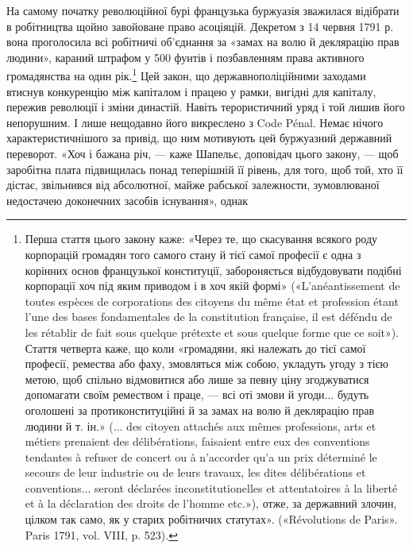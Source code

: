 На самому початку революційної бурі французька буржуазія
зважилася відібрати в робітництва щойно завойоване право
асоціяцій. Декретом з 14 червня 1791 р. вона проголосила всі
робітничі об’єднання за «замах на волю й деклярацію прав людини»,
караний штрафом у 500 фунтів і позбавленням права
активного громадянства на один рік.\footnote{
Перша стаття цього закону каже: «Через те, що скасування
всякого роду корпорацій громадян того самого стану й тієї самої професії
є одна з корінних основ французької конституції, забороняється відбудовувати
подібні корпорації хоч під яким приводом і в хоч якій формі»
(«L’anéantissement de toutes espèces de corporations des citoyens du même
état et profession étant l’une des bases fondamentales de la constitution
française, il est déféndu de les rétablir de fait sous quelque prétexte et
sous quelque forme que ce soit»). Стаття четверта каже, що коли «громадяни,
які належать до тієї самої професії, ремества або фаху, змовляться
між собою, укладуть угоду з тією метою, щоб спільно відмовитися
або лише за певну ціну згоджуватися допомагати своїм ремеством і праце,
— всі оті змови й угоди... будуть оголошені за протиконституційні
й за замах на волю й деклярацію прав людини й т. ін.» (... des citoyen
attachés aux mêmes professions, arts et métiers prenaient des délibérations,
faisaient entre eux des conventions tendantes à refuser de concert ou
à n’accorder qu’a un prix déterminé le secours de leur industrie ou de
leurs travaux, les dites délibérations et conventions... seront déclarées
inconstitutionelles et attentatoires à la liberté et à la déclaration des
droits de l’homme etc.»), отже, за державний злочин, цілком так само,
як у старих робітничих статутах». («Révolutions de Paris». Paris 1791,
vol. VIII, p. 523).
} Цей закон, що державнополіційними
заходами втиснув конкуренцію між капіталом і
працею у рамки, вигідні для капіталу, пережив революції і зміни
династій. Навіть терористичний уряд і той лишив його непорушним.
І лише нещодавно його викреслено з Code Pénal. Немає
нічого характеристичнішого за привід, що ним мотивують
цей буржуазний державний переворот. «Хоч і бажана річ, —
каже Шапельє, доповідач цього закону, — щоб заробітна плата підвищилась
понад теперішній її рівень, для того, щоб той, хто її
дістає, звільнився від абсолютної, майже рабської залежности,
зумовлюваної недостачею доконечних засобів існування», однак
\parbreak{}  %
